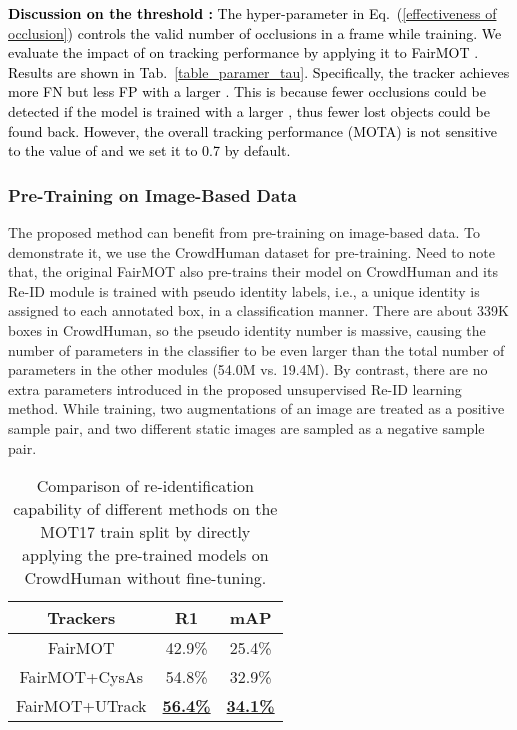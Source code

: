 \documentclass[final,1p,times,twocolumn]{elsarticle}
\newcommand{\tref}[1]{Tab.~\ref{#1}}
\newcommand{\eref}[1]{Eq.~(\ref{#1})}
\newcommand{\qiankun}[1]{\textcolor{black}{#1}}
\begin{document}
	
	
	\qiankun{\textbf{Discussion on the threshold :} The hyper-parameter  in \eref{effectiveness of occlusion} controls the valid number of occlusions in a frame while training. 
We evaluate the impact of  on tracking performance by applying it to FairMOT \cite{zhang2020fairmot}. Results are shown in \tref{table_paramer_tau}. 
	Specifically, the tracker achieves more FN but less FP with a larger . This is because fewer occlusions could be detected if the model is trained with a larger , thus fewer lost objects could be found back. However, the overall tracking performance (MOTA) is not sensitive to the value of  and we set it to 0.7 by default.}

	
	
	\subsubsection{Pre-Training on Image-Based Data}
	\label{section_pretraining_on_image_based_data}
	The proposed method can benefit from pre-training on image-based data. To demonstrate it, we use the CrowdHuman dataset \cite{shao2018crowdhuman} for pre-training. Need to note that, the original FairMOT \cite{zhang2020fairmot} also pre-trains their model on CrowdHuman and its Re-ID module is trained with pseudo identity labels, i.e., a unique identity is assigned to each annotated box, in a classification manner. There are about 339K boxes in CrowdHuman, so the pseudo identity number is massive, causing the number of parameters in the classifier to be even larger than the total number of parameters in the other modules (54.0M vs. 19.4M). By contrast, there are no extra parameters introduced in the proposed unsupervised Re-ID learning method.
	While training, two augmentations of an image are treated as a positive sample pair, and two different static images are sampled as a negative sample pair.
	
	\begin{table}
		\caption{Comparison of re-identification capability of different methods on the MOT17 train split by directly applying the pre-trained models on CrowdHuman \cite{shao2018crowdhuman} without fine-tuning.}
		\setlength{\tabcolsep}{10pt}
		\centering
\scriptsize
		\begin{tabular}{c|c|c}
			\hline
			Trackers  &R1 &mAP  \\
			\hline
			FairMOT\cite{zhang2020fairmot} &42.9\% &25.4\% \\
			FairMOT+CysAs \cite{wang2020cycas} &54.8\% &32.9\% \\
			FairMOT+UTrack &\underline{\bf56.4\%} &\underline{\bf34.1\%} \\
			\hline
		\end{tabular}
		\label{table_pretrain_on_crowdhuman_no_ft_reid}
	\end{table}		
	
\end{document}
